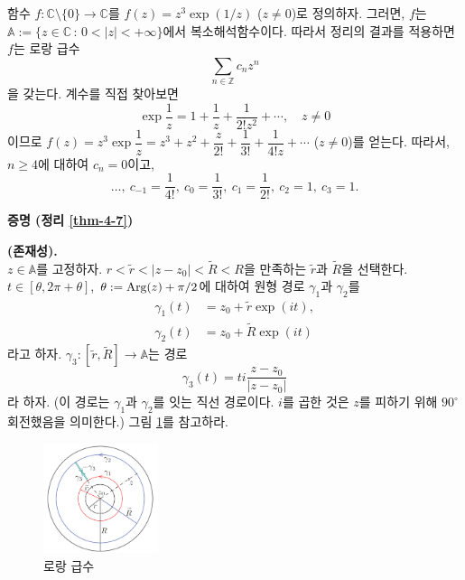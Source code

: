 \begin{saltexample}[label=example-4-11]{}{}
함수 $f:\mathbb C\setminus \{0\} \to \mathbb C$를
$f(z) = z^3\exp(1/z)$ ($z\ne0$)로 정의하자.
그러면, $f$는 $\mathbb A:= \{ z\in \mathbb C \,:\,  0 <|z| <+\infty \}$에서
복소해석함수이다. 따라서 정리의 결과를 적용하면
$f$는 로랑 급수
\[
\sum_{n\in\mathbb Z} c_n z^n
\]
을 갖는다. 
계수를 직접 찾아보면
\[
\exp \dfrac 1z = 1 + \dfrac1z + \dfrac1{2!z^2} + \cdots, \quad z\ne0
\]
이므로
$f(z) = z^3 \exp \dfrac 1z = z^3 + z^2 + \dfrac z{2!} + \dfrac1{3!}
+ \dfrac1{4!z} + \cdots$ ($z\ne 0$)를 얻는다.
따라서, $n\ge4$에 대하여 $c_n=0$이고,
\[
\ldots,\ c_{-1} = \dfrac1{4!}, \ c_0 = \dfrac1{3!},\ c_1 = \dfrac1{2!}, \ c_2 = 1, \ c_3 = 1.
\]
\end{saltexample}

{\bf 증명 (정리 \ref{thm-4-7})}

\textbf{ (존재성).} \\[1ex]
$z\in \mathbb A$를 고정하자.
$r < \tilde r < |z-z_0| <\tilde R <R$을 만족하는 $\tilde r$과  $\tilde R$을 선택한다.
$t\in [\theta, 2\pi + \theta]$, $\theta:= \mathop{\mathrm{Arg}}(z) + \pi/2$에 대하여
원형 경로 $\gamma_1$과  $\gamma_2$를 
\begin{align*}
\gamma_1(t) &= z_0 + \tilde r \exp (it),\\
\gamma_2(t) &= z_0 + \tilde R \exp (it)
\end{align*}
라고 하자. 
$\gamma_3: [\tilde r, \tilde R] \to \mathbb A$는 경로
\[
\gamma_3(t) = ti\dfrac{z-z_0}{|z-z_0|}
\]
라 하자. (이 경로는 $\gamma_1$과 $\gamma_2$를 잇는 직선 경로이다.
$i$를 곱한 것은 $z$를 피하기 위해 $90^\circ$ 회전했음을 의미한다.)
그림 \ref{fig-4-2}를 참고하라.

\begin{figure}[h!]
\begin{center}
\includegraphics[width=0.3\textwidth]{./SaltChapter/figs/fig-4-2}
\end{center}
\caption{로랑 급수}
\label{fig-4-2}
\end{figure}

